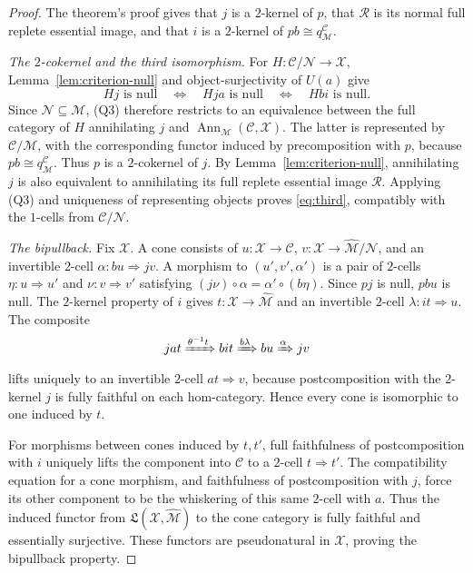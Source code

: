 \documentclass[11pt,reqno,a4paper]{amsart}
\theoremstyle{definition}
\theoremstyle{remark}
\newcommand{\C}{\mathcal{C}}
\newcommand{\M}{\mathcal{M}}
\newcommand{\N}{\mathcal{N}}
\newcommand{\0}{\mathbf{0}}
\renewcommand{\1}{\mathbf{1}}
\newcommand{\iso}{\cong}
\newcommand{\Lcat}{\mathfrak L}
\newcommand{\X}{\mathcal X}
\DeclareMathOperator{\Ann}{Ann}
\begin{document}
\begin{proof}
The theorem's proof gives that $j$ is a $2$-kernel of $p$,
that $\mathcal{R}$ is its normal full replete essential image,
and that $i$ is a $2$-kernel of $pb\iso q_{\M}^{\C}$.

\emph{The $2$-cokernel and the third isomorphism.}
For $H:\C/\N\to\X$, Lemma~\ref{lem:criterion-null} and
object-surjectivity of $U(a)$ give
\[
 Hj\text{ is null}
 \quad\Longleftrightarrow\quad
 Hja\text{ is null}
 \quad\Longleftrightarrow\quad
 Hbi\text{ is null}.
\]
Since $\N\subseteq\M$, (Q3) therefore restricts to an
equivalence between the full category of $H$ annihilating $j$
and $\Ann_{\M}(\C,\X)$. The latter is represented by
$\C/\M$, with the corresponding functor induced by
precomposition with $p$, because $pb\iso q_{\M}^{\C}$.
Thus $p$ is a $2$-cokernel of $j$.
By Lemma~\ref{lem:criterion-null}, annihilating $j$ is also
equivalent to annihilating its full replete essential image
$\mathcal{R}$. Applying (Q3) and uniqueness of representing
objects proves \eqref{eq:third}, compatibly with the $1$-cells
from $\C/\N$.

\emph{The bipullback.}
Fix $\X$. A cone consists of $u:\X\to\C$,
$v:\X\to\widehat{\M}/\N$, and an invertible $2$-cell
$\alpha:bu\Rightarrow jv$.
A morphism to $(u',v',\alpha')$ is a pair of $2$-cells
$\eta:u\Rightarrow u'$ and $\nu:v\Rightarrow v'$ satisfying
$(j\nu)\circ\alpha=\alpha'\circ(b\eta)$.
Since $pj$ is null, $pbu$ is null. The $2$-kernel property of
$i$ gives $t:\X\to\widehat{\M}$ and an invertible $2$-cell
$\lambda:it\Rightarrow u$.
The composite
\[
 jat\xRightarrow{\theta^{-1}t}bit
 \xRightarrow{b\lambda}bu
 \xRightarrow{\alpha}jv
\]
lifts uniquely to an invertible $2$-cell $at\Rightarrow v$,
because postcomposition with the $2$-kernel $j$ is fully
faithful on each hom-category. Hence every cone is isomorphic
to one induced by $t$.

For morphisms between cones induced by $t,t'$, full faithfulness
of postcomposition with $i$ uniquely lifts the component into
$\C$ to a $2$-cell $t\Rightarrow t'$. The compatibility
equation for a cone morphism, and faithfulness of
postcomposition with $j$, force its other component to be the
whiskering of this same $2$-cell with $a$.
Thus the induced functor from $\Lcat(\X,\widehat{\M})$ to
the cone category is fully faithful and essentially surjective.
These functors are pseudonatural in $\X$, proving the bipullback
property.


\end{proof}
\end{document}
